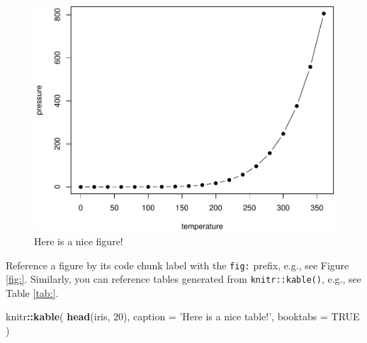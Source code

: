 \documentclass[
]{book}
\newenvironment{Shaded}{\begin{snugshade}}{\end{snugshade}}
\newcommand{\DataTypeTok}[1]{\textcolor[rgb]{0.13,0.29,0.53}{#1}}
\newcommand{\DecValTok}[1]{\textcolor[rgb]{0.00,0.00,0.81}{#1}}
\newcommand{\KeywordTok}[1]{\textcolor[rgb]{0.13,0.29,0.53}{\textbf{#1}}}
\newcommand{\NormalTok}[1]{#1}
\newcommand{\OperatorTok}[1]{\textcolor[rgb]{0.81,0.36,0.00}{\textbf{#1}}}
\newcommand{\OtherTok}[1]{\textcolor[rgb]{0.56,0.35,0.01}{#1}}
\newcommand{\StringTok}[1]{\textcolor[rgb]{0.31,0.60,0.02}{#1}}
\begin{document}
\begin{figure}

{\centering \includegraphics[width=0.8\linewidth]{MyRCodesForDataAnalysis_files/figure-latex/unnamed-chunk-3-1} 

}

\caption{Here is a nice figure!}\label{fig:unnamed-chunk-3}
\end{figure}

Reference a figure by its code chunk label with the \texttt{fig:} prefix, e.g., see Figure \ref{fig:}. Similarly, you can reference tables generated from \texttt{knitr::kable()}, e.g., see Table \ref{tab:}.

\begin{Shaded}
\begin{Highlighting}[]
\NormalTok{knitr}\OperatorTok{::}\KeywordTok{kable}\NormalTok{(}
  \KeywordTok{head}\NormalTok{(iris, }\DecValTok{20}\NormalTok{), }\DataTypeTok{caption =} \StringTok{'Here is a nice table!'}\NormalTok{,}
  \DataTypeTok{booktabs =} \OtherTok{TRUE}
\NormalTok{)}
\end{Highlighting}
\end{Shaded}
\end{document}
